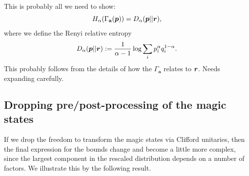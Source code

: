 \documentclass[pra,
aps,
twocolumn,
superscriptaddress,
groupedaddress,
nofootinbib,
reprint
]{revtex4-1}
\begin{document}
This is probably all we need to show:
\begin{equation}
H_\alpha(\Gamma_{\mathbf{a}}(\boldsymbol{p})) = D_\alpha(\boldsymbol{p} ||\boldsymbol{r}),
\end{equation}
where we define the Renyi relative entropy
\begin{equation}
D_\alpha (\boldsymbol{p} || \boldsymbol{r}) := \frac{1}{\alpha -1} \log \sum_i p_i^\alpha q_i^{1-\alpha}.
\end{equation}
This probably follows from the details of how the $\Gamma_{\mathbf{a}}$ relates to $\boldsymbol{r}$. Needs expanding carefully.
\subsection{Dropping pre/post-processing of the magic states}
\label{app:cliff_processing}

If we drop the freedom to transform the magic states via Clifford unitaries, then the final expression for the bounds change and become a little more complex, since the largest component in the rescaled distribution depends on a number of factors. We illustrate this by the following result.
\end{document}
